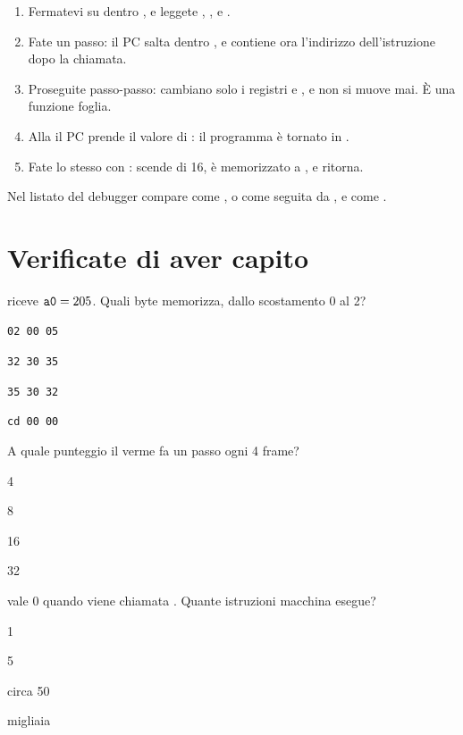 \begin{enumerate}
\item Fermatevi su  dentro , e
  leggete , ,  e .
\item Fate un passo: il PC salta dentro , e 
  contiene ora l'indirizzo dell'istruzione dopo la chiamata.
\item Proseguite passo-passo: cambiano solo i registri  e , e
   non si muove mai. È una funzione foglia.
\item Alla  il PC prende il valore di : il programma è
  tornato in .
\item Fate lo stesso con :  scende di 16,
   è memorizzato a , e ritorna.
\end{enumerate}

Nel listato del debugger  compare come , o come 
seguita da , e  come .



\section{Verificate di aver capito}

\begin{quiz}{ riceve $\texttt{a0}=205$. Quali byte memorizza, dallo scostamento 0 al 2?}
\item \texttt{02 00 05}
\item \texttt{32 30 35}
\item \texttt{35 30 32}
\item \texttt{cd 00 00}
\end{quiz}

\begin{quiz}{A quale punteggio il verme fa un passo ogni 4 frame?}
\item 4
\item 8
\item 16
\item 32
\end{quiz}

\begin{quiz}{ vale 0 quando viene chiamata . Quante istruzioni macchina esegue?}
\item 1
\item 5
\item circa 50
\item migliaia
\end{quiz}

